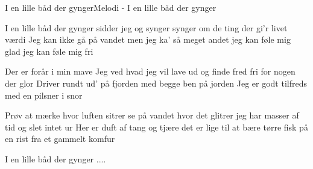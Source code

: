 \begin{sang}{I en lille båd der gynger}{Melodi - I en lille båd der gynger}
\begin{vers}
I en lille båd der gynger
sidder jeg og synger
synger om de ting
der gi'r livet værdi
Jeg kan ikke gå på vandet
men jeg ka' så meget andet
jeg kan føle mig glad
jeg kan føle mig fri
\end{vers}
\begin{vers}
Der er forår i min mave
Jeg ved hvad jeg vil lave
ud og finde fred
fri for nogen der glor
Driver rundt ud' på fjorden
med begge ben på jorden
Jeg er godt tilfreds
med en pilsner i snor
\end{vers}
\begin{vers}
Prøv at mærke hvor luften sitrer
se på vandet hvor det glitrer
jeg har masser af tid
og slet intet ur
Her er duft af tang og tjære
det er lige til at bære
tørre fisk på en rist fra et gammelt komfur
\end{vers}
\begin{vers}
I en lille båd der gynger ....
\end{vers}
\vbox{}\vfill
\vbox{}\vfill
\vbox{}\vfill
\vbox{}\vfill
\vbox{}\vfill
\laps
\end{sang}